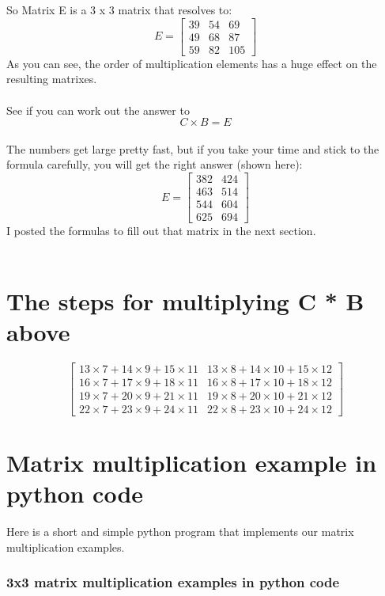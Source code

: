 \documentclass{article}
\begin{document}
\\
\\
So Matrix E is a 3 x 3 matrix that resolves to:
\[
E = \begin{bmatrix}
    39  &  54 & 69  \\
    49  &  68 & 87  \\
    59 & 82 & 105     
\end{bmatrix}
\]
As you can see, the order of multiplication elements has a huge effect on the resulting matrixes.
\\
\\
See if you can work out the answer to 
\begin{equation}
C \times B = E 
\end{equation}
\\
The numbers get large pretty fast, but if you take your time and stick to the formula carefully, you will get the right answer (shown here):
\[
E = \begin{bmatrix}
    382  &  424  \\
    463  &  514  \\
	544  &  604  \\
	625  &  694     
\end{bmatrix}
\]
I posted the formulas to fill out that matrix in the next section.
\\
\\
\newpage
\section{The steps for multiplying C * B above }

\[
\begin{bmatrix}
13 \times 7+14 \times 9+15 \times 11 & 13 \times 8+14 \times 10+15 \times 12 \\ 
16 \times 7+17 \times 9+18 \times 11 & 16 \times 8+17 \times 10+18 \times 12 \\
19 \times 7+20 \times 9+21 \times 11 & 19 \times 8+20 \times 10+21 \times 12 \\
22 \times 7+23 \times 9+24 \times 11 & 22 \times 8+23 \times 10+24 \times 12
\end{bmatrix}
\]


\newpage
\section{Matrix multiplication example in python code }
Here is a short and simple python program that implements our matrix multiplication examples.
\\
\subsubsection{3x3 matrix multiplication examples in python code}




\end{document}
